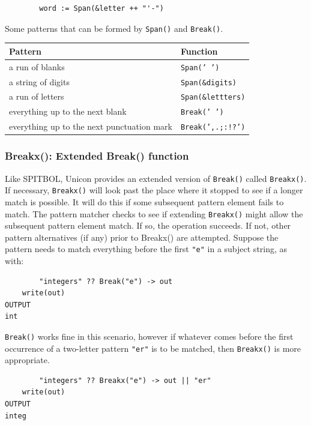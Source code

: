\documentclass[letterpaper,12pt]{article}
\begin{document}
\begin{verbatim}
        word := Span(&letter ++ "'-")
\end{verbatim}

Some patterns that can be formed by {\tt Span()} and {\tt Break()}.
\begin{table}[h]
\begin{center}
{\begin{tabular}{ | l | l | } \hline 
        Pattern & Function \\ \hline
        a run of blanks & {\tt Span(' ')} \\ \hline
	a string of digits & {\tt Span(\&digits)} \\ \hline
	a run of letters & {\tt Span(\&lettters)} \\ \hline
	everything up to the next blank & {\tt Break(' ')} \\ \hline
	everything up to the next punctuation mark & {\tt Break(',.;:!?')} \\ \hline
\end{tabular}}
\end{center}
\end{table}

\subsubsection{Breakx(): Extended Break() function}

Like SPITBOL, Unicon provides an extended version of \texttt{Break()} called
\texttt{Breakx()}. If necessary, {\tt Breakx()} will look past the
place where it
stopped to see if a longer match is possible. It will do this if some
subsequent pattern element fails to match. The pattern matcher checks
to see if extending {\tt Breakx()} might allow the subsequent pattern
element match. If so, the operation succeeds. If not, other pattern
alternatives (if any) prior to Breakx() are attempted.  Suppose the
pattern needs to match everything before the first \texttt{"e"} in a
subject string, as with:

\begin{verbatim}
        "integers" ?? Break("e") -> out
	write(out)
OUTPUT
int
\end{verbatim}

{\tt Break()} works fine in this scenario, however if whatever comes before
the first occurrence of a two-letter pattern {\tt "er"} is to be matched,
then {\tt Breakx()} is more appropriate.

\begin{verbatim}
        "integers" ?? Breakx("e") -> out || "er"
	write(out)
OUTPUT
integ
\end{verbatim}
\end{document}
